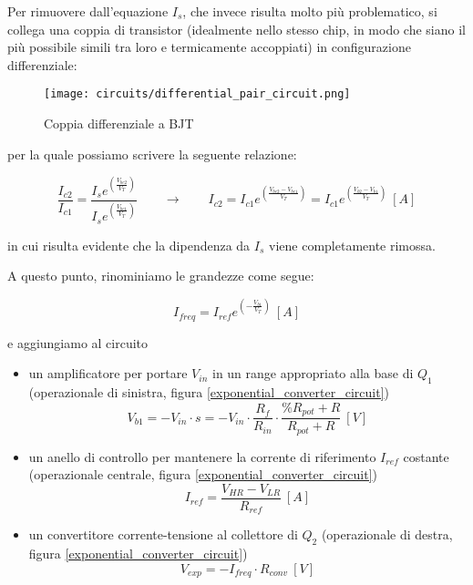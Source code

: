 Per rimuovere dall'equazione $I_s$, che invece risulta molto più problematico, si collega
una coppia di transistor (idealmente nello stesso chip, in modo che siano il più possibile
simili tra loro e termicamente accoppiati) in configurazione differenziale:

\begin{figure}[H]
    \centering
    \texttt{[image: circuits/differential\_pair\_circuit.png]}
    \caption{Coppia differenziale a BJT}
    \label{differential_pair_circuit}
\end{figure}

per la quale possiamo scrivere la seguente relazione:

\begin{displaymath}
    \frac{I_{c2}}{I_{c1}}=\frac{I_s e^{\left(\frac{V_{be2}}{V_T}\right)}}{I_s e^{\left(\frac{V_{be1}}{V_T}\right)}}
    \qquad
    \rightarrow
    \qquad
    I_{c2}=I_{c1}e^{\left(\frac{V_{be2}-V_{be1}}{V_T}\right)}=I_{c1}e^{\left(\frac{V_{b2}-V_{b1}}{V_T}\right)}\ [A]
\end{displaymath}

in cui risulta evidente che la dipendenza da $I_s$ viene completamente rimossa.

A questo punto, rinominiamo le grandezze come segue:

\begin{displaymath}
    I_{freq}=I_{ref}e^{\left(-\frac{V_{b1}}{V_T}\right)}\ [A]
\end{displaymath}

e aggiungiamo al circuito

\begin{itemize}
    \item un amplificatore per portare $V_{in}$ in un range appropriato alla base di $Q_1$
          (operazionale di sinistra, figura \ref{exponential_converter_circuit})
          \begin{displaymath}
              V_{b1}=-V_{in}\cdot s=
              -V_{in}\cdot\frac{R_f}{R_{in}}\cdot\frac{\%R_{pot}+R}{R_{pot}+R}\ [V]
          \end{displaymath}
    \item un anello di controllo per mantenere la corrente di riferimento $I_{ref}$ costante
          (operazionale centrale, figura \ref{exponential_converter_circuit})
          \begin{displaymath}
              I_{ref}=\frac{V_{HR}-V_{LR}}{R_{ref}}\ [A]
          \end{displaymath}
    \item un convertitore corrente-tensione al collettore di $Q_2$ (operazionale di destra,
          figura \ref{exponential_converter_circuit})
          \begin{displaymath}
              V_{exp}=-I_{freq}\cdot R_{conv}\ [V]
          \end{displaymath}
\end{itemize}

